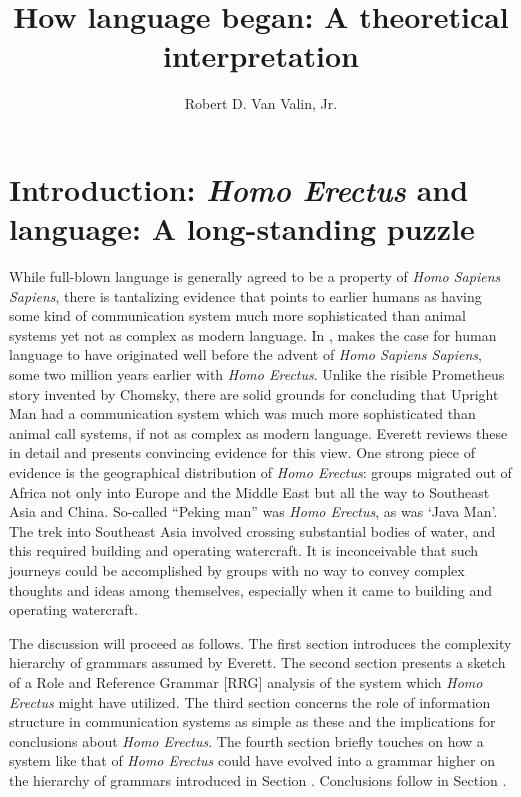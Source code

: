 \documentclass[output=paper,colorlinks,citecolor=brown]{langscibook}
\author{Robert D. Van Valin, Jr.\orcid{}\affiliation{The State University of New York at Buffalo \& Heinrich Heine University Düsseldorf}}
\title{How language began: A theoretical interpretation}
\begin{document}
\maketitle

\section{Introduction: \emph{Homo Erectus} and language: A long-standing puzzle}
While full-blown language is generally agreed to be a property of \emph{Homo Sapiens Sapiens}, there is tantalizing evidence that points to earlier humans as having some kind of communication system much more sophisticated than animal systems yet not as complex as modern language. In , \citet{everett2017language} makes the case for human language to have originated well before the advent of \emph{Homo Sapiens Sapiens}, some two million years earlier with \emph{Homo Erectus}. Unlike the risible Prometheus story invented by Chomsky, there are solid grounds for concluding that Upright Man had a communication system which was much more sophisticated than animal call systems, if not as complex as modern language.  Everett reviews these in detail and presents convincing evidence for this view.  One strong piece of evidence is the geographical distribution of \emph{Homo Erectus}: groups migrated out of Africa not only into Europe and the Middle East but all the way to Southeast Asia and China.  So-called “Peking man” was \emph{Homo Erectus}, as was ‘Java Man’.  The trek into Southeast Asia involved crossing substantial bodies of water, and this required building and operating watercraft.  It is inconceivable that such journeys could be accomplished by groups with no way to convey complex thoughts and ideas among themselves, especially when it came to building and operating watercraft.  

The discussion will proceed as follows. The first section introduces the complexity hierarchy of grammars assumed by Everett.  The second section presents a sketch of a Role and Reference Grammar [RRG] \citep{van2005exploring,van1997syntax} analysis of the system which \emph{Homo Erectus} might have utilized.  The third section concerns the role of information structure in communication systems as simple as these and the implications for conclusions about \emph{Homo Erectus}.  The fourth section briefly touches on how a system like that of \emph{Homo Erectus} could have evolved into a grammar higher on the hierarchy of grammars introduced in Section . Conclusions follow in Section .
\end{document}
